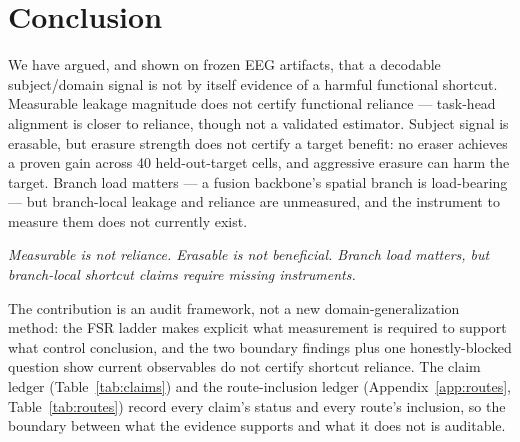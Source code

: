 \section{Conclusion}
\label{sec:conclusion}

We have argued, and shown on frozen EEG artifacts, that a decodable subject/domain signal is not by
itself evidence of a harmful functional shortcut. Measurable leakage magnitude does not certify
functional reliance --- task-head alignment is closer to reliance, though not a validated estimator.
Subject signal is erasable, but erasure strength does not certify a target benefit: no eraser achieves
a proven gain across 40 held-out-target cells, and aggressive erasure can harm the target. Branch load
matters --- a fusion backbone's spatial branch is load-bearing --- but branch-local leakage and
reliance are unmeasured, and the instrument to measure them does not currently exist.

\begin{center}
\emph{Measurable is not reliance. Erasable is not beneficial. Branch load matters, but branch-local
shortcut claims require missing instruments.}
\end{center}

The contribution is an audit framework, not a new domain-generalization method: the FSR ladder makes
explicit what measurement is required to support what control conclusion, and the two boundary findings
plus one honestly-blocked question show current observables do not certify shortcut reliance. The claim
ledger (Table~\ref{tab:claims}) and the route-inclusion ledger (Appendix~\ref{app:routes},
Table~\ref{tab:routes}) record every claim's status and every route's inclusion, so the boundary
between what the evidence supports and what it does not is auditable.

\begin{table}[t]
\centering\small

\caption{Claim ledger. Statuses are derived from the frozen result artifacts, not hand-set.}
\label{tab:claims}
\end{table}
